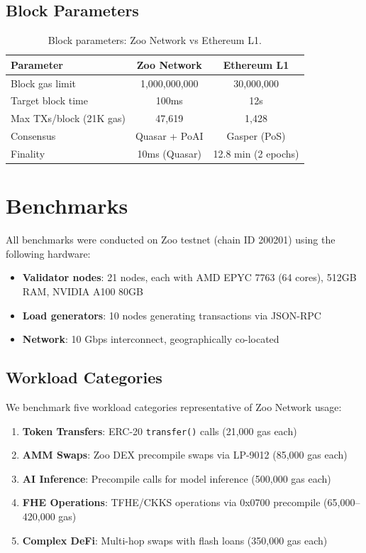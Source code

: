 \documentclass[11pt,letterpaper]{article}
\begin{document}
\subsection{Block Parameters}

\begin{table}[t]
\centering
\begin{tabular}{lcc}
\toprule
\textbf{Parameter} & \textbf{Zoo Network} & \textbf{Ethereum L1} \\
\midrule
Block gas limit & 1,000,000,000 & 30,000,000 \\
Target block time & 100ms & 12s \\
Max TXs/block (21K gas) & 47,619 & 1,428 \\
Consensus & Quasar + PoAI & Gasper (PoS) \\
Finality & 10ms (Quasar) & 12.8 min (2 epochs) \\
\bottomrule
\end{tabular}
\caption{Block parameters: Zoo Network vs Ethereum L1.}
\label{tab:params}
\end{table}

\section{Benchmarks}
\label{sec:benchmarks}

All benchmarks were conducted on Zoo testnet (chain ID 200201) using the following hardware:

\begin{itemize}
    \item \textbf{Validator nodes}: 21 nodes, each with AMD EPYC 7763 (64 cores), 512GB RAM, NVIDIA A100 80GB
    \item \textbf{Load generators}: 10 nodes generating transactions via JSON-RPC
    \item \textbf{Network}: 10 Gbps interconnect, geographically co-located
\end{itemize}

\subsection{Workload Categories}

We benchmark five workload categories representative of Zoo Network usage:

\begin{enumerate}
    \item \textbf{Token Transfers}: ERC-20 \texttt{transfer()} calls (21,000 gas each)
    \item \textbf{AMM Swaps}: Zoo DEX precompile swaps via LP-9012 (85,000 gas each)
    \item \textbf{AI Inference}: Precompile calls for model inference (500,000 gas each)
    \item \textbf{FHE Operations}: TFHE/CKKS operations via 0x0700 precompile (65,000--420,000 gas)
    \item \textbf{Complex DeFi}: Multi-hop swaps with flash loans (350,000 gas each)
\end{enumerate}
\end{document}
